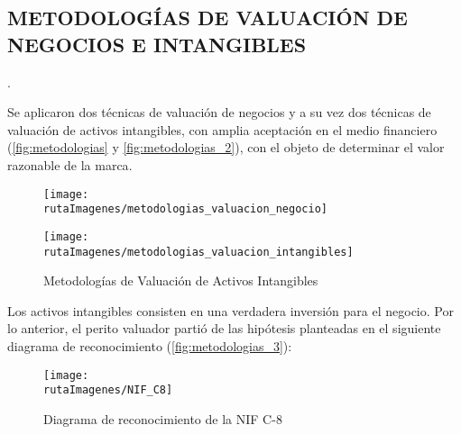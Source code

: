 \subsection{METODOLOG\'IAS DE VALUACI\'ON DE NEGOCIOS E INTANGIBLES}. 

Se aplicaron \textcolor{secundario}{dos t\'ecnicas de valuaci\'on de negocios} y a su vez \textcolor{principal}{dos t\'ecnicas de valuaci\'on de activos intangibles}, con amplia aceptaci\'on en el medio financiero (\autoref{fig:metodologias} y \autoref{fig:metodologias_2}), con el objeto de determinar el \textcolor{secundario}{valor razonable de la marca}.\\

\begin{figure}[H]
\centering
\caption{Metodolog\'ias de Valuaci\'on de negocios\label{fig:metodologias}}\vspace{10pt}
\texttt{[image: \\rutaImagenes/metodologias\_valuacion\_negocio]}\\

\caption{Metodolog\'ias de Valuaci\'on de Activos Intangibles\label{fig:metodologias_2}}
\texttt{[image: \\rutaImagenes/metodologias\_valuacion\_intangibles]}\\

\end{figure}

Los activos intangibles consisten en una verdadera inversi\'on para el negocio. Por lo anterior, el perito valuador parti\'o de las hip\'otesis planteadas en el siguiente diagrama de reconocimiento (\autoref{fig:metodologias_3}):

\begin{figure}[H]
\centering
\caption{Diagrama de reconocimiento de la NIF C-8\label{fig:metodologias_3}}
\texttt{[image: \\rutaImagenes/NIF\_C8]}\\
\end{figure}

